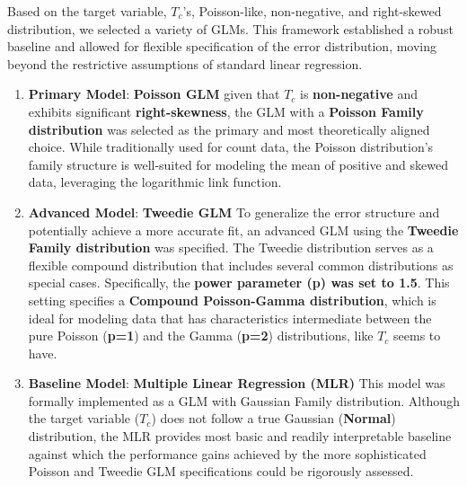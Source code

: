 \documentclass[conference]{IEEEtran}
\begin{document}
Based on the target variable, $T_c$'s, Poisson-like, non-negative, and right-skewed distribution, we selected a variety of GLMs. This framework established a robust baseline and allowed for flexible specification of the error distribution, moving beyond the restrictive assumptions of standard linear regression.
\begin{enumerate}
	\item \textbf{Primary Model}: \textbf{Poisson GLM} given that $T_c$ is \textbf{ non-negative} and exhibits significant  \textbf{right-skewness}, the GLM with a \textbf{Poisson Family distribution} was selected as the primary and most theoretically aligned choice. While traditionally used for count data, the Poisson distribution's family structure is well-suited for modeling the mean of positive and skewed data, leveraging the logarithmic link function.
	\item \textbf{Advanced Model}: \textbf{Tweedie GLM} To generalize the error structure and potentially achieve a more accurate fit, an advanced GLM using the \textbf{Tweedie Family distribution} was specified. The Tweedie distribution serves as a flexible compound distribution that includes several common distributions as special cases. Specifically, the \textbf{power parameter (p) was set to 1.5}. This setting specifies a \textbf{Compound Poisson-Gamma distribution}, which is ideal for modeling data that has characteristics intermediate between the pure Poisson (\textbf{p=1}) and the Gamma (\textbf{p=2}) distributions, like $T_c$ seems to have.
	\item \textbf{Baseline Model}: \textbf{Multiple Linear Regression (MLR)} This model was formally implemented as a GLM with Gaussian Family distribution. Although the target variable ($T_c$) does not follow a true Gaussian (\textbf{Normal}) distribution, the MLR provides most basic and readily interpretable baseline against which the performance gains achieved by the more sophisticated Poisson and Tweedie GLM specifications could be rigorously assessed.\\
\end{enumerate}
\end{document}
